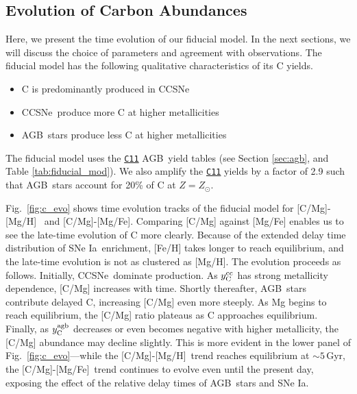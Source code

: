 \documentclass[fleqn,usenatbib]{mnras}
\newcommand{\cxi}{\texttt{\hyperlink{C11}{C11}}}
\newcommand{\cc}{CCSNe}
\newcommand{\agb}{AGB}
\newcommand{\ia}{SNe Ia}
\newcommand{\caah}{[C/Mg]-[Mg/H]}
\newcommand{\caafe}{[C/Mg]-[Mg/Fe]}
\newcommand{\Ycc}{\ensuremath{y_{\rm C}^{\rm cc}}}
\newcommand{\Ycagb}{\ensuremath{y_{\rm C}^{\rm agb}}}
\newcommand{\about}[1]{${\sim} #1$}
\begin{document}
\subsection{Evolution of Carbon Abundances}

Here, we present the time evolution of our fiducial model. In the next sections, we will discuss the choice of parameters and agreement with observations. 
The fiducial model has the following qualitative characteristics of its C yields.
\begin{itemize}
    \item C is predominantly produced in \cc
    \item \cc\ produce more C at higher metallicities
    \item \agb\ stars produce less C at higher metallicities 
\end{itemize} 
The fiducial model uses the \cxi{} \agb\ yield tables (see Section \ref{sec:agb}, and Table \ref{tab:fiducial_mod}). We also amplify the \cxi{} yields by a factor of 2.9 such that \agb\ stars account for 20\% of C at $Z=Z_\odot$. 

Fig.~\ref{fig:c_evo} shows time evolution tracks of the fiducial model for \caah~ and \caafe. Comparing [C/Mg] against [Mg/Fe] enables us to see the late-time evolution of C more clearly. Because of the extended delay time distribution of \ia\ enrichment, [Fe/H] takes longer to reach equilibrium, and the late-time evolution is not as clustered as [Mg/H].
The evolution proceeds as follows.
Initially, \cc\ dominate production. As $\Ycc$ has strong metallicity dependence, [C/Mg] increases with time. Shortly thereafter, \agb\ stars contribute delayed C, increasing [C/Mg] even more steeply. As Mg begins to reach equilibrium, the [C/Mg] ratio plateaus as C approaches equilibrium. Finally, as $\Ycagb$ decreases or even becomes negative with higher metallicity, the [C/Mg] abundance may decline slightly. 
This is more evident in the lower panel of Fig.~\ref{fig:c_evo}---while the \caah\ trend reaches equilibrium at \about{5}\,Gyr, the \caafe\ trend continues to evolve even until the present day, exposing the effect of the relative delay times of \agb\ stars and \ia.
\end{document}
